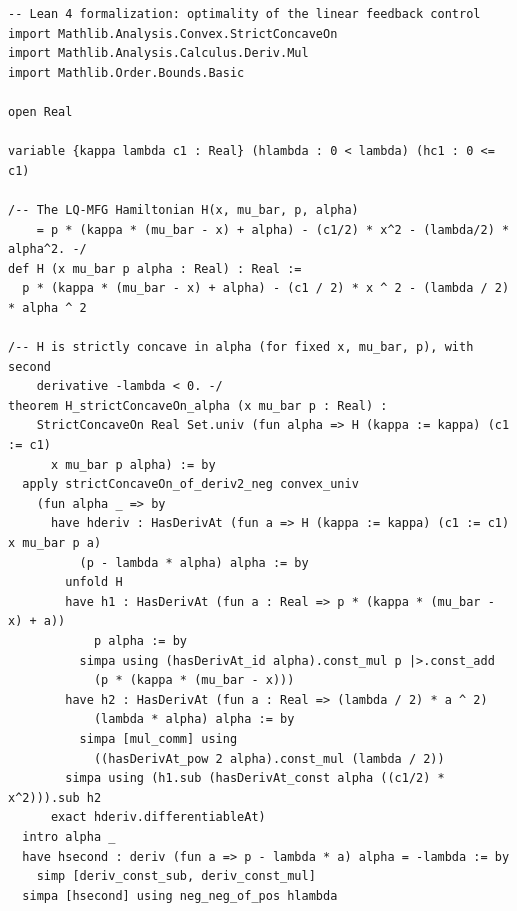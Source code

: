 \begin{lstlisting}[style=lean4, caption={Optimality of the linear feedback control $\alpha^* = p/\lambda$ for the LQ-MFG Hamiltonian.}]
-- Lean 4 formalization: optimality of the linear feedback control
import Mathlib.Analysis.Convex.StrictConcaveOn
import Mathlib.Analysis.Calculus.Deriv.Mul
import Mathlib.Order.Bounds.Basic

open Real

variable {kappa lambda c1 : Real} (hlambda : 0 < lambda) (hc1 : 0 <= c1)

/-- The LQ-MFG Hamiltonian H(x, mu_bar, p, alpha)
    = p * (kappa * (mu_bar - x) + alpha) - (c1/2) * x^2 - (lambda/2) * alpha^2. -/
def H (x mu_bar p alpha : Real) : Real :=
  p * (kappa * (mu_bar - x) + alpha) - (c1 / 2) * x ^ 2 - (lambda / 2) * alpha ^ 2

/-- H is strictly concave in alpha (for fixed x, mu_bar, p), with second
    derivative -lambda < 0. -/
theorem H_strictConcaveOn_alpha (x mu_bar p : Real) :
    StrictConcaveOn Real Set.univ (fun alpha => H (kappa := kappa) (c1 := c1)
      x mu_bar p alpha) := by
  apply strictConcaveOn_of_deriv2_neg convex_univ
    (fun alpha _ => by
      have hderiv : HasDerivAt (fun a => H (kappa := kappa) (c1 := c1) x mu_bar p a)
          (p - lambda * alpha) alpha := by
        unfold H
        have h1 : HasDerivAt (fun a : Real => p * (kappa * (mu_bar - x) + a))
            p alpha := by
          simpa using (hasDerivAt_id alpha).const_mul p |>.const_add
            (p * (kappa * (mu_bar - x)))
        have h2 : HasDerivAt (fun a : Real => (lambda / 2) * a ^ 2)
            (lambda * alpha) alpha := by
          simpa [mul_comm] using
            ((hasDerivAt_pow 2 alpha).const_mul (lambda / 2))
        simpa using (h1.sub (hasDerivAt_const alpha ((c1/2) * x^2))).sub h2
      exact hderiv.differentiableAt)
  intro alpha _
  have hsecond : deriv (fun a => p - lambda * a) alpha = -lambda := by
    simp [deriv_const_sub, deriv_const_mul]
  simpa [hsecond] using neg_neg_of_pos hlambda


\end{lstlisting}

